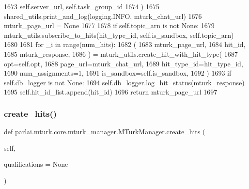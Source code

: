 \begin{DoxyCode}
1673             self.server\_url, self.task\_group\_id
1674         )
1675         shared\_utils.print\_and\_log(logging.INFO, mturk\_chat\_url)
1676         mturk\_page\_url = \textcolor{keywordtype}{None}
1677 
1678         \textcolor{keywordflow}{if} self.topic\_arn \textcolor{keywordflow}{is} \textcolor{keywordflow}{not} \textcolor{keywordtype}{None}:
1679             mturk\_utils.subscribe\_to\_hits(hit\_type\_id, self.is\_sandbox, self.topic\_arn)
1680 
1681         \textcolor{keywordflow}{for} \_i \textcolor{keywordflow}{in} range(num\_hits):
1682             (
1683                 mturk\_page\_url,
1684                 hit\_id,
1685                 mturk\_response,
1686             ) = mturk\_utils.create\_hit\_with\_hit\_type(
1687                 opt=self.opt,
1688                 page\_url=mturk\_chat\_url,
1689                 hit\_type\_id=hit\_type\_id,
1690                 num\_assignments=1,
1691                 is\_sandbox=self.is\_sandbox,
1692             )
1693             \textcolor{keywordflow}{if} self.db\_logger \textcolor{keywordflow}{is} \textcolor{keywordflow}{not} \textcolor{keywordtype}{None}:
1694                 self.db\_logger.log\_hit\_status(mturk\_response)
1695             self.hit\_id\_list.append(hit\_id)
1696         \textcolor{keywordflow}{return} mturk\_page\_url
1697 
\end{DoxyCode}
\mbox{\label{classparlai_1_1mturk_1_1core_1_1mturk__manager_1_1MTurkManager_acd01b6d3cd60d04e679b2bdab7b0a09d}} 
\subsubsection{\texorpdfstring{create\+\_\+hits()}{create\_hits()}}
{\footnotesize\ttfamily def parlai.\+mturk.\+core.\+mturk\+\_\+manager.\+M\+Turk\+Manager.\+create\+\_\+hits (\begin{DoxyParamCaption}\item[{}]{self,  }\item[{}]{qualifications = {\ttfamily None} }\end{DoxyParamCaption})}


